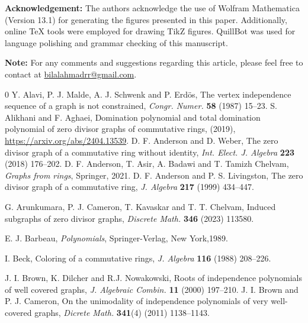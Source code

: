 \documentclass[12pt,twoside]{article}
\begin{document}
\noindent\textbf{Acknowledgement:} %
The authors acknowledge the use of Wolfram Mathematica (Version 13.1) for generating the figures presented in this paper. Additionally, online TeX tools were employed for drawing TikZ figures. QuillBot was used for language polishing and grammar checking of this manuscript.

\noindent\textbf{Note:} For any comments and suggestions regarding this article, please feel free to contact at \href{mailto:bilalahmadrr@gmail.com}{bilalahmadrr@gmail.com}.


\begin{thebibliography}{0}
	 Y. Alavi, P. J. Malde, A. J. Schwenk and P. Erd\"os, The vertex independence sequence of a graph is not constrained, \emph{Congr. Numer.} \textbf{58} (1987) 15--23.
	 S. Alikhani and F. Aghaei, Domination polynomial and total domination polynomial of zero divisor graphs of commutative rings, (2019), \url{https://arxiv.org/abs/2404.13539}.
	 {D. F. Anderson and D. Weber, The zero divisor graph of a commutative ring without identity, \em Int. Elect. J. Algebra} {\bf 223} (2018) 176--202.
	 D. F. Anderson, T. Asir, A. Badawi and T. Tamizh Chelvam,
	\textit{Graphs from rings}, Springer, 2021.
	 { D. F. Anderson and P. S. Livingston, The zero divisor graph of a commutative ring, \em J. Algebra} {\bf 217} (1999) 434--447.
	
	 G. Arunkumara, P. J. Cameron, T. Kavaskar and T. T. Chelvam, Induced subgraphs of zero divisor graphs, \emph{Discrete Math.} \textbf{346} (2023) 113580. 
	
	 E. J. Barbeau, \textit{Polynomials}, Springer-Verlag, New York,1989.
	
	  {I. Beck, Coloring of a commutative rings, \em J. Algebra} {\bf 116} (1988) 208--226.
	
	 J. I. Brown, K. Dilcher and R.J. Nowakowski, Roots of independence polynomials of well covered graphs, \emph{J. Algebraic Combin.} \textbf{11} (2000) 197--210.
	 J. I. Brown and P. J. Cameron, On the unimodality of independence polynomials of very well-covered graphs, \textit{Dicrete Math.} {\bf 341}(4) (2011) 1138--1143.
	

\end{thebibliography}
\end{document}
